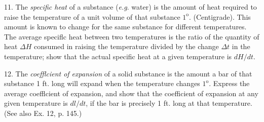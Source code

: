 \documentclass[12pt]{article}
\begin{document}
11. The {\it specific heat} of a substance ({\it e.g}. water) is the amount of
heat required to raise the temperature of a unit volume of that substance $1^{\text{o}}$. (Centigrade). This amount is known to change for the same substance for different temperatures. The average speciflc heat between two 
temperatures is the ratio of the quantity of heat $\Delta H$ consumed in 
raising the temperature divided by the change $\Delta t$ in the temperature; show that the actual specific heat at a given temperature is $dH/dt$.

12. The {\it coefflcient of expansion} of a solid substance is the amount a
bar of that substance 1 ft. long will expand when the temperature changes
$1^{\mathrm{o}}$. Express the average coefflcient of expansion, and show that 
the coefficient of expansion at any given temperature is $dl/dt$, if the bar 
is precisely 1 ft. long at that temperature. (See also Ex. 12, p. 145.)
\end{document}
